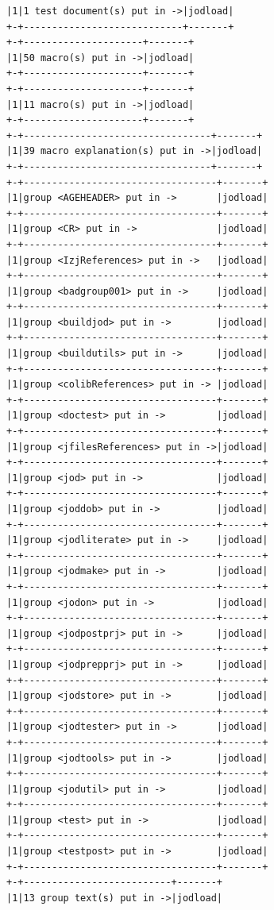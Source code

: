 \documentclass[11pt,letter,landscape]{article}
\begin{document}
\begin{Verbatim}[commandchars=\\\{\}]
|1|1 test document(s) put in ->|jodload|
+-+----------------------------+-------+
+-+---------------------+-------+
|1|50 macro(s) put in ->|jodload|
+-+---------------------+-------+
+-+---------------------+-------+
|1|11 macro(s) put in ->|jodload|
+-+---------------------+-------+
+-+---------------------------------+-------+
|1|39 macro explanation(s) put in ->|jodload|
+-+---------------------------------+-------+
+-+----------------------------------+-------+
|1|group <AGEHEADER> put in ->       |jodload|
+-+----------------------------------+-------+
|1|group <CR> put in ->              |jodload|
+-+----------------------------------+-------+
|1|group <IzjReferences> put in ->   |jodload|
+-+----------------------------------+-------+
|1|group <badgroup001> put in ->     |jodload|
+-+----------------------------------+-------+
|1|group <buildjod> put in ->        |jodload|
+-+----------------------------------+-------+
|1|group <buildutils> put in ->      |jodload|
+-+----------------------------------+-------+
|1|group <colibReferences> put in -> |jodload|
+-+----------------------------------+-------+
|1|group <doctest> put in ->         |jodload|
+-+----------------------------------+-------+
|1|group <jfilesReferences> put in ->|jodload|
+-+----------------------------------+-------+
|1|group <jod> put in ->             |jodload|
+-+----------------------------------+-------+
|1|group <joddob> put in ->          |jodload|
+-+----------------------------------+-------+
|1|group <jodliterate> put in ->     |jodload|
+-+----------------------------------+-------+
|1|group <jodmake> put in ->         |jodload|
+-+----------------------------------+-------+
|1|group <jodon> put in ->           |jodload|
+-+----------------------------------+-------+
|1|group <jodpostprj> put in ->      |jodload|
+-+----------------------------------+-------+
|1|group <jodprepprj> put in ->      |jodload|
+-+----------------------------------+-------+
|1|group <jodstore> put in ->        |jodload|
+-+----------------------------------+-------+
|1|group <jodtester> put in ->       |jodload|
+-+----------------------------------+-------+
|1|group <jodtools> put in ->        |jodload|
+-+----------------------------------+-------+
|1|group <jodutil> put in ->         |jodload|
+-+----------------------------------+-------+
|1|group <test> put in ->            |jodload|
+-+----------------------------------+-------+
|1|group <testpost> put in ->        |jodload|
+-+----------------------------------+-------+
+-+--------------------------+-------+
|1|13 group text(s) put in ->|jodload|

\end{Verbatim}
\end{document}
